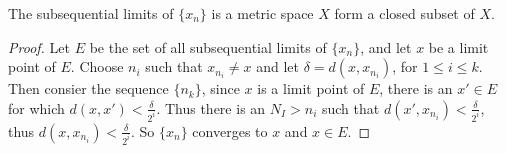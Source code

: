 \begin{theorem}\label{3.2.3}
    The subsequential limits of $\{x_n\}$ is a metric space  $X$ form a closed subset of  
    $X$.
\end{theorem}
\begin{proof}
    Let $E$ be the set of all subsequential limits of $\{x_n\}$, and let  $x$ be a limit point 
    of  $E$. Choose $n_i$ such that $x_{n_i} \neq x$ and let  $\delta=d(x,x_{n_i})$, for 
    $1 \leq i \leq k$. Then consier the sequence  $\{n_k\}$, since  $x$ is a limit point of  $E$, 
    there is an  $x' \in E$ for which  $d(x,x')<\frac{\delta}{2^i}$. Thus there is an $N_I>n_i$ 
    such that $d(x',x_{n_i})<\frac{\delta}{2^i}$, thus $d(x,x_{n_i})<\frac{\delta}{2^i}$. So 
    $\{x_n\}$ converges to  $x$ and  $x \in E$.
\end{proof}
